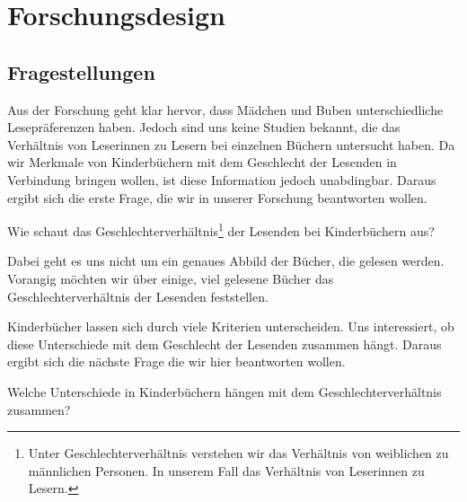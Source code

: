 \chapter{Forschungsdesign}

\section{Fragestellungen}

Aus der Forschung geht klar hervor, dass Mädchen und Buben
unterschiedliche Lesepräferenzen haben. Jedoch sind uns keine Studien
bekannt, die das Verhältnis von Leserinnen zu Lesern bei einzelnen
Büchern untersucht haben. Da wir Merkmale von Kinderbüchern mit dem
Geschlecht der Lesenden in Verbindung bringen wollen, ist diese
Information jedoch unabdingbar. Daraus ergibt sich die erste Frage, die
wir in unserer Forschung beantworten wollen.

\begin{frage}\label{fra:andere}
Wie schaut das Geschlechterverhältnis\footnote{Unter Geschlechterverhältnis verstehen wir das Verhältnis von 
weiblichen zu männlichen Personen.
In unserem Fall das Verhältnis von Leserinnen zu Lesern.} 
der Lesenden bei Kinderbüchern aus?
\end{frage}

Dabei geht es uns nicht um ein genaues Abbild der Bücher, die gelesen
werden. Vorangig möchten wir über einige, viel gelesene Bücher das
Geschlechterverhältnis der Lesenden feststellen.

Kinderbücher lassen sich durch viele Kriterien unterscheiden. Uns
interessiert, ob diese Unterschiede mit dem Geschlecht der Lesenden
zusammen hängt. Daraus ergibt sich die nächste Frage die wir hier
beantworten wollen.

\begin{frage}\label{fra:unterschiede}
Welche Unterschiede in Kinderbüchern hängen mit dem Geschlechterverhältnis zusammen?
\end{frage}

